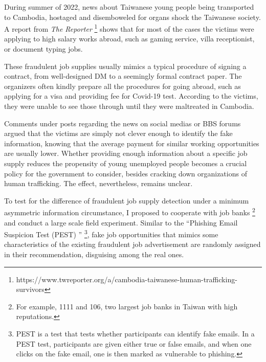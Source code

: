 During summer of 2022, news about Taiwanese young people being transported to Cambodia, 
hostaged and disemboweled for organs shock the Taiwanese society. 
A report from \emph{The Reporter}
\footnote{https://www.twreporter.org/a/cambodia-taiwanese-human-trafficking-survivors} 
shows that for most of the cases the victims were applying to high salary works abroad, 
such as gaming service, villa receptionist, or document typing jobs.

These fraudulent job supplies usually mimics a typical procedure of signing a contract, 
from well-designed DM to a seemingly formal contract paper. 
The organizers often kindly prepare all the procedures for going abroad, 
such as applying for a visa and providing fee for Covid-19 test.
According to the victims, they were unable to see those through until they were maltreated in Cambodia.   

Comments under posts regarding the news on social medias or BBS forums argued that the victims are simply not 
clever enough to identify the fake information, 
knowing that the average payment for similar working opportunities are usually lower.
Whether providing enough information about a specific job supply reduces the propensity of young 
unemployed people becomes a crucial policy for the government to consider, 
besides cracking down organizations of human trafficking. The effect, nevertheless, remains unclear.

To test for the difference of fraudulent job supply detection under a minimum asymmetric information circumstance, 
I proposed to cooperate with job banks 
\footnote{For example, 1111 and 106, two largest job banks in Taiwan with high reputations.} 
and conduct a large scale field experiment. 
Similar to the  ``Phishing Email Suspicion Test (PEST) ''
\footnote{PEST is a test that tests whether participants can identify fake emails. In a PEST test, participants are given either true or false emails, 
and when one clicks on the fake email, one is then marked as vulnerable to phishing.}, 
fake job opportunities that mimics some characteristics of the existing fraudulent job advertisement are 
randomly assigned in their recommendation, disguising among the real ones. 



